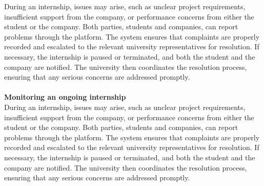 During an internship, issues may arise, such as unclear project requirements, insufficient support from the company, or performance concerns from either the student or the company. Both parties, students and companies, can report problems through the platform. The system ensures that complaints are properly recorded and escalated to the relevant university representatives for resolution. If necessary, the internship is paused or terminated, and both the student and the company are notified. The university then coordinates the resolution process, ensuring that any serious concerns are addressed promptly.\\\\
\textbf{Monitoring an ongoing internship}\\
During an internship, issues may arise, such as unclear project requirements, insufficient support from the company, or performance concerns from either the student or the company. Both parties, students and companies, can report problems through the platform. The system ensures that complaints are properly recorded and escalated to the relevant university representatives for resolution. If necessary, the internship is paused or terminated, and both the student and the company are notified. The university then coordinates the resolution process, ensuring that any serious concerns are addressed promptly.\\\\
